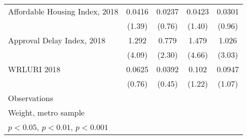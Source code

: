 \begin{table}[htbp]
\begin{tabular}{l*{4}{c}}
\addlinespace
Affordable Housing Index, 2018&      0.0416         &      0.0237         &      0.0423         &      0.0301         \\
                    &      (1.39)         &      (0.76)         &      (1.40)         &      (0.96)         \\
\addlinespace
Approval Delay Index, 2018&       1.292\sym{***}&       0.779\sym{*}  &       1.479\sym{***}&       1.026\sym{**} \\
                    &      (4.09)         &      (2.30)         &      (4.66)         &      (3.03)         \\
\addlinespace
WRLURI 2018         &      0.0625         &      0.0392         &       0.102         &      0.0947         \\
                    &      (0.76)         &      (0.45)         &      (1.22)         &      (1.07)         \\
\midrule
Observations        &                     &                     &                     &                     \\
\bottomrule
\multicolumn{5}{l}{\footnotesize Weight, metro sample}\\
\multicolumn{5}{l}{\footnotesize \sym{*} \(p<0.05\), \sym{**} \(p<0.01\), \sym{***} \(p<0.001\)}\\
\end{tabular}
\end{table}
